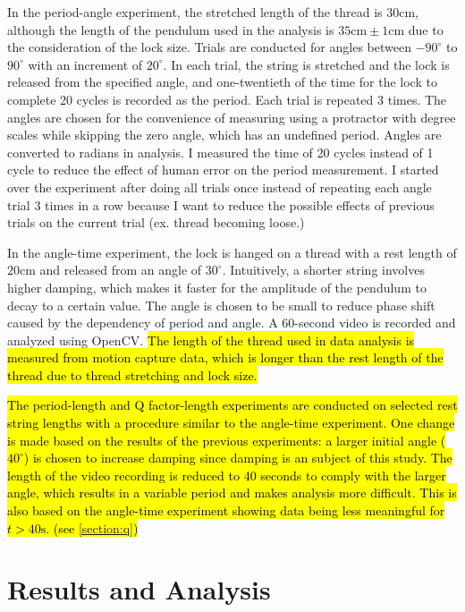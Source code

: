 \documentclass[12pt]{article}
\DeclareRobustCommand{\hlnew}[1]{{\sethlcolor{hlcnew}\hl{#1}}}
\begin{document}
In the period-angle experiment, the stretched length of the thread is $30\mathrm{cm}$, although the length of the pendulum used in the analysis is $35\mathrm{cm}\pm1\mathrm{cm}$ due to the consideration of the lock size. Trials are conducted for angles between $-90^\circ$ to $90^\circ$ with an increment of $20^\circ$. In each trial, the string is stretched and the lock is released from the specified angle, and one-twentieth of the time for the lock to complete 20 cycles is recorded as the period. Each trial is repeated 3 times. The angles are chosen for the convenience of measuring using a protractor with degree scales while skipping the zero angle, which has an undefined period. Angles are converted to radians in analysis. I measured the time of 20 cycles instead of 1 cycle to reduce the effect of human error on the period measurement. I started over the experiment after doing all trials once instead of repeating each angle trial 3 times in a row because I want to reduce the possible effects of previous trials on the current trial (ex. thread becoming loose.)

In the angle-time experiment, the lock is hanged on a thread with a rest length of $20\mathrm{cm}$ and released from an angle of $30^\circ$. Intuitively, a shorter string involves higher damping, which makes it faster for the amplitude of the pendulum to decay to a certain value. The angle is chosen to be small to reduce phase shift caused by the dependency of period and angle. A 60-second video is recorded and analyzed using OpenCV. \hlnew{The length of the thread used in data analysis is measured from motion capture data, which is longer than the rest length of the thread due to thread stretching and lock size.}

\hlnew{The period-length and Q factor-length experiments are conducted on selected rest string lengths with a procedure similar to the angle-time experiment. One change is made based on the results of the previous experiments: a larger initial angle ($40^\circ$) is chosen to increase damping since damping is an subject of this study. The length of the video recording is reduced to 40 seconds to comply with the larger angle, which results in a variable period and makes analysis more difficult. This is also based on the angle-time experiment showing data being less meaningful for $t>40\mathrm{s}$. (see {\ref{section:q}})}


\section{Results and Analysis}
\end{document}
